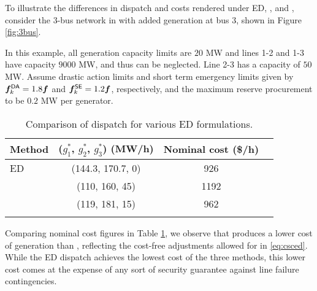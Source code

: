 \iffalse
In \cite{bouffard2008stochastic}, the authors consider the costs of both generator re-dispatch, as well as potential load shed, but seek to minimize cost in expectation. As we will demonstrate, this can lead to higher levels of load shed than necessary. 
\fi
To illustrate the differences in dispatch and costs rendered under ED, \PSCED{}, and \CSCED{}, consider the 3-bus network in \cite{lesieutre2011examining}  with added generation at bus 3, shown in Figure \ref{fig:3bus}. 

In this example, all generation capacity limits are $20$ MW and lines 1-2 and 1-3
have capacity $9000$ MW, and thus can be neglected. Line 2-3 has a capacity of $50$ MW. Assume drastic action limits and short term emergency limits 
given by ${\bm{f}}_k^{\sf DA}{} = 1.8 {\bm{f}}$ and ${\bm{f}}_k^{\sf SE}{} = 1.2 {\bm{f}}$, respectively, and the maximum reserve procurement to be $0.2$ MW per generator. 
%
\begin{table}[ht]
    \centering
        \caption{Comparison of dispatch for various ED formulations.}
    \begin{tabular}{l c c c}
         \toprule
         \textbf{Method} & ($g_1^*$, $g_2^*$, $g_3^*$) \textbf{(MW/h)} & \textbf{Nominal cost (\$/h)}  \\
         \midrule
         ED & (144.3, 170.7, 0) & 926 \\
         \PSCED{} & (110, 160, 45) & 1192 \\
         \CSCED{} & (119, 181, 15) & 962  \\
         \bottomrule \\
    \end{tabular}
    \label{tab:ED.compare}
\end{table}
%
Comparing nominal cost figures in Table \ref{tab:ED.compare}, we observe that \CSCED{} produces a lower cost of generation than \PSCED{}, reflecting the cost-free adjustments allowed for in \eqref{eq:csced}. While the ED dispatch achieves the lowest cost of the three methods, this lower cost comes at the expense of any sort of security guarantee against line failure contingencies. 

